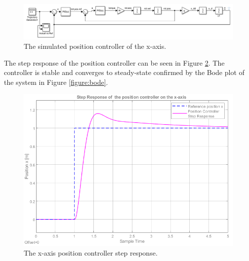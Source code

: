 \begin{figure}[H]
\centering
 \includegraphics[width=\textwidth]{Figures/pos_contr_simulink.png}
 \caption{The simulated position controller of the x-axis.}
 \label{figure:position_controller}
\end{figure}

The step response of the position controller can be seen in Figure \ref{figure:x_axis}. The controller is stable and converges to steady-state confirmed by the Bode plot of the system in Figure \ref{figure:bode}.

\begin{figure}[H]
\centering
 \includegraphics[width=\textwidth]{Figures/x_axis.png}
 \caption{The x-axis position controller step response.}
 \label{figure:x_axis}
\end{figure}

